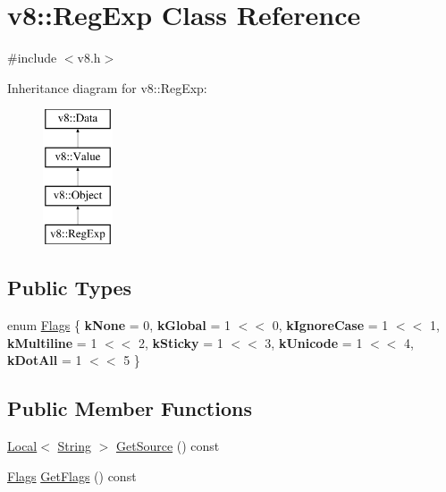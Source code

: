 \hypertarget{classv8_1_1RegExp}{}\section{v8\+:\+:Reg\+Exp Class Reference}
\label{classv8_1_1RegExp}


{\ttfamily \#include $<$v8.\+h$>$}

Inheritance diagram for v8\+:\+:Reg\+Exp\+:\begin{figure}[H]
\begin{center}
\leavevmode
\includegraphics[height=4.000000cm]{classv8_1_1RegExp}
\end{center}
\end{figure}
\subsection*{Public Types}
\begin{DoxyCompactItemize}
\item 
enum \mbox{\hyperlink{classv8_1_1RegExp_aa4718a5c1f18472aff3bf51ed694fc5a}{Flags}} \{ \newline
{\bfseries k\+None} = 0, 
{\bfseries k\+Global} = 1 $<$$<$ 0, 
{\bfseries k\+Ignore\+Case} = 1 $<$$<$ 1, 
{\bfseries k\+Multiline} = 1 $<$$<$ 2, 
\newline
{\bfseries k\+Sticky} = 1 $<$$<$ 3, 
{\bfseries k\+Unicode} = 1 $<$$<$ 4, 
{\bfseries k\+Dot\+All} = 1 $<$$<$ 5
 \}
\end{DoxyCompactItemize}
\subsection*{Public Member Functions}
\begin{DoxyCompactItemize}
\item 
\mbox{\hyperlink{classv8_1_1Local}{Local}}$<$ \mbox{\hyperlink{classv8_1_1String}{String}} $>$ \mbox{\hyperlink{classv8_1_1RegExp_ad43d2879796a6991ff19954f4755778a}{Get\+Source}} () const
\item 
\mbox{\hyperlink{classv8_1_1RegExp_aa4718a5c1f18472aff3bf51ed694fc5a}{Flags}} \mbox{\hyperlink{classv8_1_1RegExp_aaf00a07b6f8368a1a99bf0bac327af21}{Get\+Flags}} () const
\end{DoxyCompactItemize}

